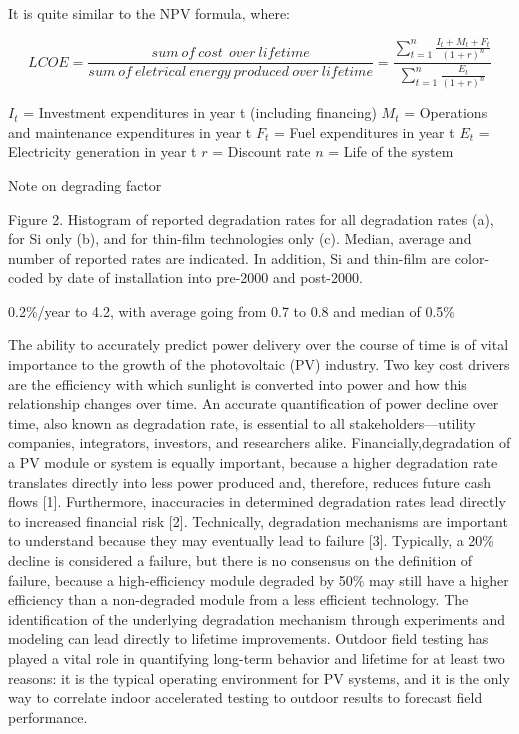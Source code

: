 \documentclass[]{book}
\theoremstyle{definition}
\theoremstyle{definition}
\theoremstyle{definition}
\theoremstyle{remark}
\begin{document}
It is quite similar to the NPV formula, where:

\[LCOE = \frac{sum \ of \ cost\ \ over \ lifetime}{sum \ of \ eletrical\ energy\ produced \ over \  lifetime} = \frac{\sum_{t=1}^{n}\frac{I_t+M_t+F_t}{(1+r)^n}} {\sum_{t=1}^{n}\frac{E_t}{(1+r)^n}}\]

\(I_t\) = Investment expenditures in year t (including financing)
\(M_t\) = Operations and maintenance expenditures in year t \(F_t\) =
Fuel expenditures in year t \(E_t\) = Electricity generation in year t
\(r\) = Discount rate \(n\) = Life of the system

Note on degrading factor

Figure 2. Histogram of reported degradation rates for all degradation
rates (a), for Si only (b), and for thin-film technologies only (c).
Median, average and number of reported rates are indicated. In addition,
Si and thin-film are color-coded by date of installation into pre-2000
and post-2000.

0.2\%/year to 4.2, with average going from 0.7 to 0.8 and median of
0.5\%

The ability to accurately predict power delivery over the course of time
is of vital importance to the growth of the photovoltaic (PV) industry.
Two key cost drivers are the efficiency with which sunlight is converted
into power and how this relationship changes over time. An accurate
quantification of power decline over time, also known as degradation
rate, is essential to all stakeholders---utility companies, integrators,
investors, and researchers alike. Financially,degradation of a PV module
or system is equally important, because a higher degradation rate
translates directly into less power produced and, therefore, reduces
future cash flows {[}1{]}. Furthermore, inaccuracies in determined
degradation rates lead directly to increased financial risk {[}2{]}.
Technically, degradation mechanisms are important to understand because
they may eventually lead to failure {[}3{]}. Typically, a 20\% decline
is considered a failure, but there is no consensus on the definition of
failure, because a high-efficiency module degraded by 50\% may still
have a higher efficiency than a non-degraded module from a less
efficient technology. The identification of the underlying degradation
mechanism through experiments and modeling can lead directly to lifetime
improvements. Outdoor field testing has played a vital role in
quantifying long-term behavior and lifetime for at least two reasons: it
is the typical operating environment for PV systems, and it is the only
way to correlate indoor accelerated testing to outdoor results to
forecast field performance.
\end{document}
